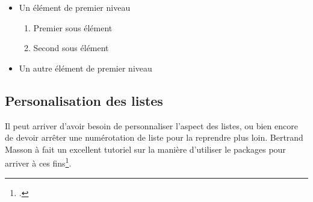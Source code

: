 \begin{itemize}
	\item Un élément de premier niveau
	\begin{enumerate}
			\item Premier sous élément
			\item Second sous élément
	\end{enumerate}
	\item Un autre élément de premier niveau
\end{itemize}

\subsection{Personalisation des listes}

Il peut arriver d'avoir besoin de personnaliser l'aspect des listes, ou bien encore de devoir arrêter une numérotation de liste pour la reprendre plus loin. Bertrand Masson à fait un excellent tutoriel sur la manière d'utiliser le packages  pour arriver à ces fins\footcite{bebert_liste}. 
